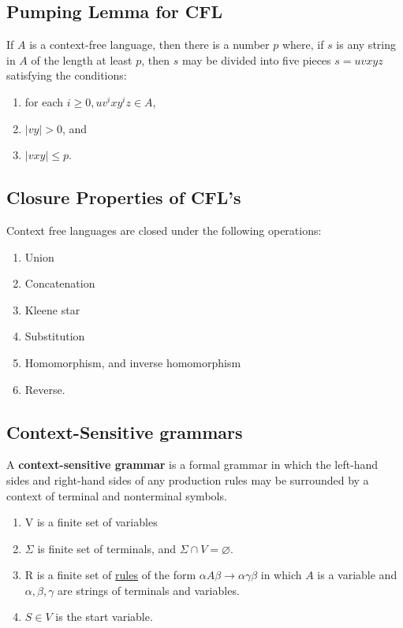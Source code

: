 \documentclass[a4paper]{article}
\begin{document}
\subsection{Pumping Lemma for CFL} %
\label{sub:Pumping Lemma for CFL}
If $A$ is a context-free language, then there is a number $p$ where, if $s$ is any string in $A$ of the length at least $p$, then $s$ may be divided into five pieces $s=uvxyz$ satisfying the conditions:
\begin{enumerate}
  \item for each $i \geq 0, uv^ixy^iz \in A$,
  \item $|vy| > 0$, and 
  \item $|vxy| \leq p$.
\end{enumerate}

\subsection{Closure Properties of CFL's} %
\label{sub:Closure Properties of CFL's}
Context free languages are closed under the following operations:
\begin{enumerate}
  \item Union
  \item Concatenation
  \item Kleene star
  \item Substitution
  \item Homomorphism, and inverse homomorphism
  \item Reverse.
\end{enumerate}
\subsection{Context-Sensitive grammars} %
\label{sub:Context-Sensitive grammars}
A {\bf context-sensitive grammar} is a formal grammar in which the left-hand sides and right-hand sides of any production rules may be surrounded by a context of terminal and nonterminal symbols. 
\begin{enumerate}
  \item V is a finite set of variables 
  \item $\Sigma$ is finite set of terminals, and $\Sigma \cap V = \varnothing$.
  \item R is a finite set of \underline{rules} of the form $\alpha A\beta\rightarrow\alpha \gamma\beta$ in which $A$ is a variable and $\alpha,\beta,\gamma$ are strings of terminals and variables.
  \item $S\in V$ is the start variable.
\end{enumerate}
\end{document}

